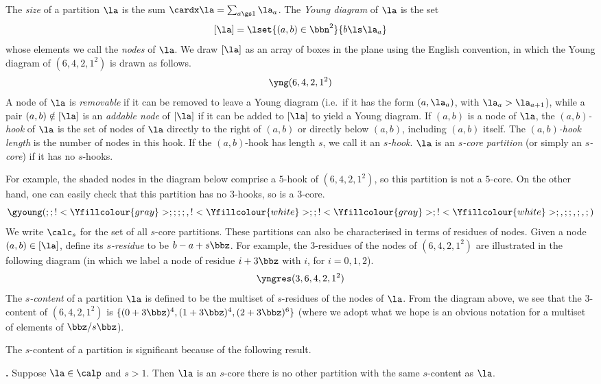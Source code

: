 \documentclass[a4paper, 11pt, twoside]{article}
\begin{document}
The \emph{size} of a partition $\la$ is the sum $\cardx\la=\sum_{a\gs1}\la_a$. The \emph{Young diagram} of $\la$ is the set
\[
[\la]=\lset{(a,b)\in\bbn^2}{b\ls\la_a}
\]
whose elements we call the \emph{nodes} of $\la$. We draw $[\la]$ as an array of boxes in the plane using the English convention, in which the Young diagram of $(6,4,2,1^2)$ is drawn as follows.
\[
\yng(6,4,2,1^2)
\]
A node of $\la$ is \emph{removable} if it can be removed to leave a Young diagram (i.e.\ if it has the form $(a,\la_a)$, with $\la_a>\la_{a+1}$), while a pair $(a,b)\notin[\la]$ is an \emph{addable node} of $[\la]$ if it can be added to $[\la]$ to yield a Young diagram. If $(a,b)$ is a node of $\la$, the \emph{$(a,b)$-hook} of $\la$ is the set of nodes of $\la$ directly to the right of $(a,b)$ or directly below $(a,b)$, including $(a,b)$ itself. The \emph{$(a,b)$-hook length} is the number of nodes in this hook. If the $(a,b)$-hook has length $s$, we call it an \emph{$s$-hook}. $\la$ is an \emph{$s$-core partition} (or simply an \emph{$s$-core}) if it has no $s$-hooks.

For example, the shaded nodes in the diagram below comprise a $5$-hook of $(6,4,2,1^2)$, so this partition is not a $5$-core. On the other hand, one can easily check that this partition has no $3$-hooks, so is a $3$-core.
\[
\gyoung(;;!<\Yfillcolour{gray}>;;;;,!<\Yfillcolour{white}>;;!<\Yfillcolour{gray}>;!<\Yfillcolour{white}>;,;;,;,;)
\]
We write $\cores s$ for the set of all $s$-core partitions. These partitions can also be characterised in terms of residues of nodes. Given a node $(a,b)\in[\la]$, define its \emph{$s$-residue} to be $b-a+s\bbz$. For example, the $3$-residues of the nodes of $(6,4,2,1^2)$ are illustrated in the following diagram (in which we label a node of residue $i+3\bbz$ with $i$, for $i=0,1,2$).
\[
\yngres(3,6,4,2,1^2)
\]
The \emph{$s$-content} of a partition $\la$ is defined to be the multiset of $s$-residues of the nodes of $\la$. From the diagram above, we see that the $3$-content of $(6,4,2,1^2)$ is $\{(0+3\bbz)^4,(1+3\bbz)^4,(2+3\bbz)^6\}$ (where we adopt what we hope is an obvious notation for a multiset of elements of $\bbz/s\bbz$).

The $s$-content of a partition is significant because of the following result.

\begin{thmciting}\textup{\textbf{\cite{litt}.}}\label{rescore}
Suppose $\la\in\calp$ and $s>1$. Then $\la$ is an $s$-core \iff there is no other partition with the same $s$-content as $\la$.
\end{thmciting}
\end{document}
